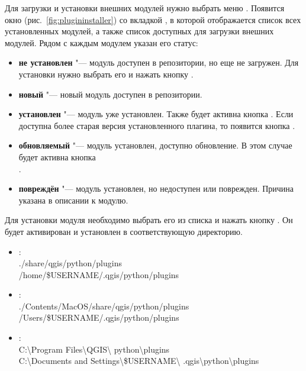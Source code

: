 Для загрузки и установки внешних модулей нужно выбрать меню
 \arrow {}.
Появится окно 
(рис.~\ref{fig:plugininstaller}) со вкладкой , в которой
отображается список всех установленных модулей, а также список доступных
для загрузки внешних модулей. Рядом с каждым модулем указан его статус:
\begin{itemize}[label=--]
\item \textbf{не установлен} "--- модуль доступен в репозитории, но еще
не загружен. Для установки нужно выбрать его и нажать кнопку
.
\item \textbf{новый} "--- новый модуль доступен в репозитории.
\item \textbf{установлен} "--- модуль уже установлен. Также будет
активна кнопка . Если доступна более
старая версия установленного плагина, то появится кнопка
.
\item \textbf{обновляемый} "--- модуль установлен, доступно обновление.
В этом случае будет активна кнопка \\
.
\item \textbf{повреждён} "--- модуль установлен, но недоступен или
поврежден. Причина указана в описании к модулю.
\end{itemize}


Для установки модуля необходимо выбрать его из списка и нажать кнопку
. Он будет активирован и установлен в
соответствующую директорию.

\begin{itemize}[label=--]
\item {}:\\
./share/qgis/python/plugins \\
/home/\$USERNAME/.qgis/python/plugins
\item {}:\\
./Contents/MacOS/share/qgis/python/plugins \\
/Users/\$USERNAME/.qgis/python/plugins
\item {}:\\
C:\textbackslash Program Files\textbackslash QGIS\textbackslash
python\textbackslash plugins \\
C:\textbackslash Documents and Settings\textbackslash\$USERNAME\textbackslash
.qgis\textbackslash python\textbackslash plugins
\end{itemize}

